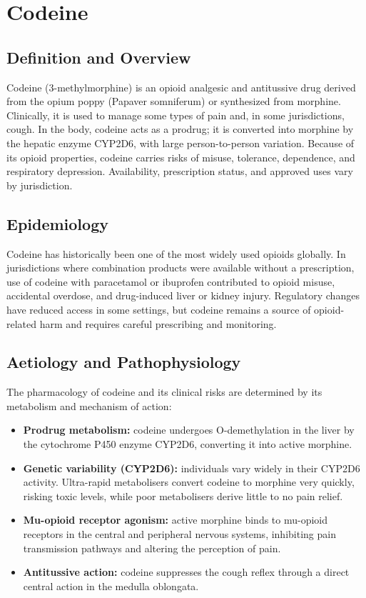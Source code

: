 \chapter{Codeine}

\section*{Definition and Overview}
Codeine (3-methylmorphine) is an opioid analgesic and antitussive drug derived from the opium poppy (Papaver somniferum) or synthesized from morphine. Clinically, it is used to manage some types of pain and, in some jurisdictions, cough. In the body, codeine acts as a prodrug; it is converted into morphine by the hepatic enzyme CYP2D6, with large person-to-person variation. Because of its opioid properties, codeine carries risks of misuse, tolerance, dependence, and respiratory depression. Availability, prescription status, and approved uses vary by jurisdiction.

\section*{Epidemiology}
Codeine has historically been one of the most widely used opioids globally. In jurisdictions where combination products were available without a prescription, use of codeine with paracetamol or ibuprofen contributed to opioid misuse, accidental overdose, and drug-induced liver or kidney injury. Regulatory changes have reduced access in some settings, but codeine remains a source of opioid-related harm and requires careful prescribing and monitoring.

\section*{Aetiology and Pathophysiology}
The pharmacology of codeine and its clinical risks are determined by its metabolism and mechanism of action:

\begin{itemize}
    \item \textbf{Prodrug metabolism:} codeine undergoes O-demethylation in the liver by the cytochrome P450 enzyme CYP2D6, converting it into active morphine.
    \item \textbf{Genetic variability (CYP2D6):} individuals vary widely in their CYP2D6 activity. Ultra-rapid metabolisers convert codeine to morphine very quickly, risking toxic levels, while poor metabolisers derive little to no pain relief.
    \item \textbf{Mu-opioid receptor agonism:} active morphine binds to mu-opioid receptors in the central and peripheral nervous systems, inhibiting pain transmission pathways and altering the perception of pain.
    \item \textbf{Antitussive action:} codeine suppresses the cough reflex through a direct central action in the medulla oblongata.
\end{itemize}

